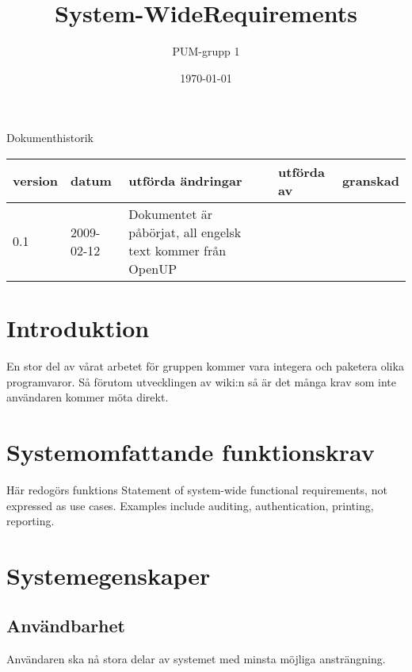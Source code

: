 

\ifpdf
\else
\fi

\title{System-WideRequirements}
\author{PUM-grupp 1}
\date{\today}



\maketitle\thispagestyle{empty}

\newpage

{\centering \Large{Dokumenthistorik\\}}

\vspace{10pt}
\begin{tabularx}{\textwidth}{ |l|l|X|l|l| }
  \hline
    \textbf{version} & \textbf{datum} & \textbf{utförda ändringar} & \textbf{utförda av} & \textbf{granskad} \\
	\hline 
  0.1 & 2009-02-12 &  Dokumentet är påbörjat, all engelsk text kommer från OpenUP & &   \\
  \hline
\end{tabularx}

\newpage

\setcounter{tocdepth}{2}
\tableofcontents
\newpage

\section{Introduktion}
En stor del av vårat arbetet för gruppen kommer vara integera och paketera olika programvaror. Så förutom utvecklingen av wiki:n så är det många krav som inte användaren kommer möta direkt.

\section{Systemomfattande funktionskrav}
Här redogörs funktions
Statement of system-wide functional requirements, not expressed as use cases. Examples include auditing, authentication, printing, reporting.

\section{Systemegenskaper}
\subsection{Användbarhet}
Användaren ska nå stora delar av systemet med minsta möjliga ansträngning. 
